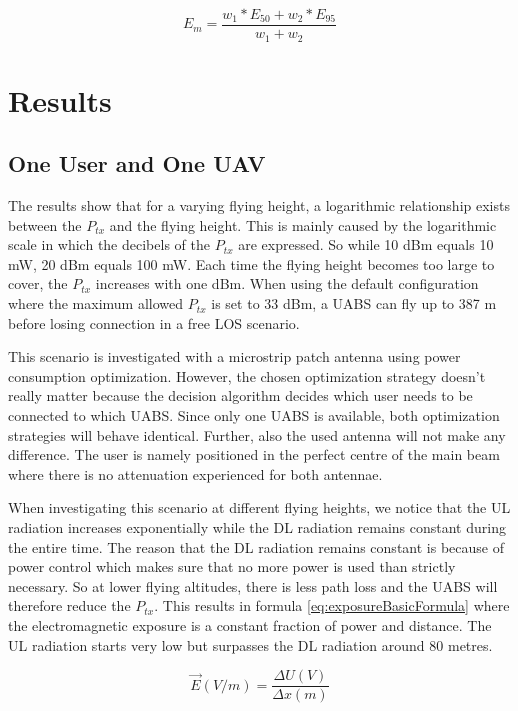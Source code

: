 \documentclass[twocolumn]{phdsymp} %
\begin{document}
\begin{equation} 
E_m = \frac{w_1 * E_{50} + w_2 * E_{95}}{w_1 + w_2}
\label{eq:em}
\end{equation}

\section{Results}
\subsection{One User and One \gls{UAV}}

The  results show that for a varying flying height, a logarithmic relationship exists between the $P_{tx}$ and the flying height. 
This is mainly caused by the logarithmic 
scale in which the decibels of the $P_{tx}$ are expressed. So while 10 dBm equals 10 mW, 20 dBm equals 100 mW. 
Each time the flying height becomes too large to cover, the 
$P_{tx}$ increases with one dBm. 
When using the default configuration where the maximum allowed $P_{tx}$ is set to 33 dBm,
a \gls{UABS} can fly up to 387 m before losing connection in a free \gls{LOS} scenario.

This scenario is investigated with a microstrip patch antenna using power consumption optimization. 
 However, the chosen optimization strategy doesn't really matter because the decision 
 algorithm decides which user 
needs to be connected to which \gls{UABS}. Since only one \gls{UABS} is available, both optimization strategies will behave identical.
Further, also the used antenna will not make any difference.
The user is namely positioned in the perfect centre of the main beam where there is 
no attenuation experienced for both antennae.

When investigating this scenario at different flying heights, we notice 
that the \gls{UL} radiation 
increases exponentially while 
the \gls{DL} radiation remains constant during the entire time. The reason that the \gls{DL} radiation
remains constant is because of power control which makes sure that no more power is used than strictly necessary. 
So at lower flying altitudes, there is less path loss and the \gls{UABS} 
will therefore reduce the $P_{tx}$. This results in formula \ref{eq:exposureBasicFormula} where the electromagnetic exposure is a constant fraction of power and distance.
The \gls{UL} radiation starts very low but surpasses the \gls{DL} radiation 
around 80 metres.

\begin{equation}
\vec{E} (V/m) = \frac{\Delta U (V) }{\Delta x (m)}
\label{eq:exposureBasicFormula}
\end{equation}
\end{document}
